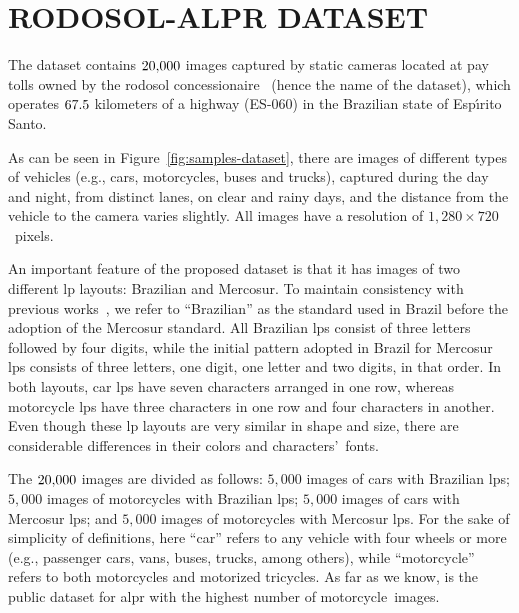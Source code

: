 

\section{\uppercase{RodoSol-ALPR dataset}}
\label{sec:dataset}

The \dataset dataset contains $20{,}000$ images captured by static cameras located at pay tolls owned by the \gls*{rodosol} concessionaire~\citep{rodosol} (hence the name of the dataset), which operates $67.5$ kilometers of a highway (ES-060) in the Brazilian state of Esp\'{\i}rito Santo.

As can be seen in Figure~\ref{fig:samples-dataset}, there are images of different types of vehicles (e.g., cars, motorcycles, buses and trucks), captured during the day and night, from distinct lanes, on clear and rainy days, and the distance from the vehicle to the camera varies slightly.
All images have a resolution of $1{,}280 \times 720$~pixels. 

An important feature of the proposed dataset is that it has images of two different \gls*{lp} layouts: Brazilian and Mercosur.
To maintain consistency with previous works~\citep{izidio2020embedded,oliveira2021vehicle,silva2022flexible}, we refer to ``Brazilian'' as the standard used in Brazil before the adoption of the Mercosur standard.
All Brazilian \glspl*{lp} consist of three letters followed by four digits, while the initial pattern adopted in Brazil for Mercosur \glspl*{lp} consists of three letters, one digit, one letter and two digits, in that order.
In both layouts, car \glspl*{lp} have seven characters arranged in one row, whereas motorcycle \glspl*{lp} have three characters in one row and four characters in another.
Even though these \gls*{lp} layouts are very similar in shape and size, there are considerable differences in their colors and characters'~fonts.

The $20{,}000$ images are divided as follows: $5{,}000$ images of cars with Brazilian \glspl*{lp}; $5{,}000$ images of motorcycles with Brazilian \glspl*{lp}; $5{,}000$ images of cars with Mercosur \glspl*{lp}; and $5{,}000$ images of motorcycles with Mercosur \glspl*{lp}.
For the sake of simplicity of definitions, here ``car'' refers to any vehicle with four wheels or more (e.g., passenger cars, vans, buses, trucks, among others), while ``motorcycle'' refers to both motorcycles and motorized tricycles.
As far as we know, \dataset is the public dataset for \gls*{alpr} with the highest number of motorcycle~images.


